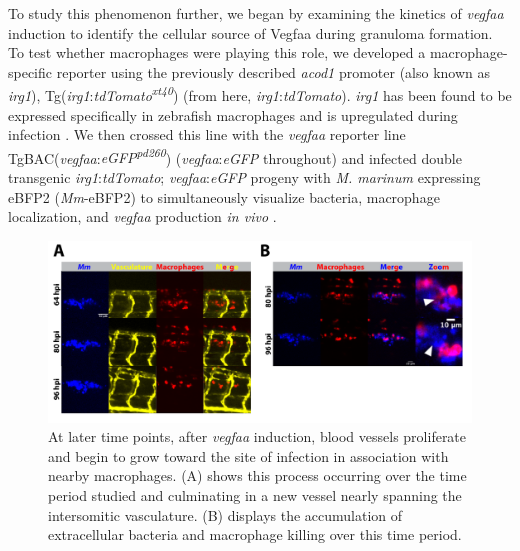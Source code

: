 To study this phenomenon further, we began by examining the kinetics of \textit{vegfaa} induction to identify the cellular source of Vegfaa during granuloma formation. To test whether macrophages were playing this role, we developed a macrophage\hyp{}specific reporter using the previously described \textit{acod1} promoter (also known as \textit{irg1}), Tg(\textit{irg1}:\textit{tdTomato\textsuperscript{xt40}}) (from here, \textit{irg1}:\textit{tdTomato}). \textit{irg1} has been found to be expressed specifically in zebrafish macrophages and is upregulated during infection \citep{Sanderson2015, Kwon2022}. We then crossed this line with the \textit{vegfaa} reporter line TgBAC(\textit{vegfaa}:\textit{eGFP\textsuperscript{pd260}}) (\textit{vegfaa}:\textit{eGFP} throughout) \citep{Karra2018} and infected double transgenic \textit{irg1}:\textit{tdTomato}; \textit{vegfaa}:\textit{eGFP} progeny with \textit{M. marinum} expressing eBFP2 (\textit{Mm}\hyp{}eBFP2) to simultaneously visualize bacteria, macrophage localization, and \textit{vegfaa} production \textit{in vivo} \citep{Takaki2013}.

\begin{figure}
\centering
\includegraphics[width=\textwidth]{images/extracellularflk1.pdf}
\caption{At later time points, after \textit{vegfaa} induction, blood vessels proliferate and begin to grow toward the site of infection in association with nearby macrophages. (A) shows this process occurring over the time period studied and culminating in a new vessel nearly spanning the intersomitic vasculature. (B) displays the accumulation of extracellular bacteria and macrophage killing over this time period.}
\label{figure:ecflk1}

\end{figure}

